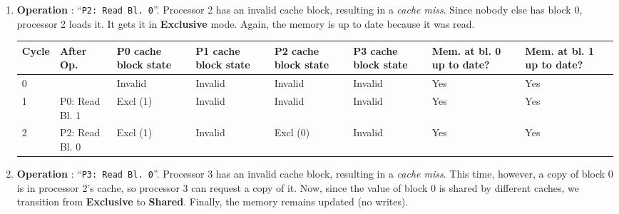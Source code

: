 \begin{enumerate}
    \item \textbf{Operation \theenumi}: ``\texttt{P2: Read Bl. 0}''. Processor 2 has an invalid cache block, resulting in a \emph{cache miss}. Since nobody else has block 0, processor 2 loads it. It gets it in \textbf{Exclusive} mode. Again, the memory is up to date because it was read.

    \begin{table}[!htp]
        \centering
        \begin{adjustbox}{width={\textwidth},totalheight={\textheight},keepaspectratio}
            \begin{tabular}{@{} l l p{4em} p{4em} p{4em} p{4em} p{3em} p{3em} @{}}
                \toprule
                \textbf{Cycle} & \textbf{After Op.} & \textbf{P0 cache block state} & \textbf{P1 cache block state} & \textbf{P2 cache block state} & \textbf{P3 cache block state} & \textbf{Mem. at bl. 0 up to date?} & \textbf{Mem. at bl. 1 up to date?} \\
                \midrule
                0   &                   & Invalid   & Invalid   & Invalid   & Invalid   & Yes   & Yes   \\ [.3em]
                1   & P0: Read Bl. 1    & Excl (1)  & Invalid   & Invalid   & Invalid   & Yes   & Yes   \\ [.3em]
                2   & P2: Read Bl. 0    & Excl (1)  & Invalid   & Excl (0)  & Invalid   & Yes   & Yes   \\
                \bottomrule
            \end{tabular}
        \end{adjustbox}
    \end{table}


    \newpage


    \item \textbf{Operation \theenumi}: ``\texttt{P3: Read Bl. 0}''. Processor 3 has an invalid cache block, resulting in a \emph{cache miss}. This time, however, a copy of block 0 is in processor 2's cache, so processor 3 can request a copy of it. Now, since the value of block 0 is shared by different caches, we transition from \textbf{Exclusive} to \textbf{Shared}. Finally, the memory remains updated (no writes).


\end{enumerate}
